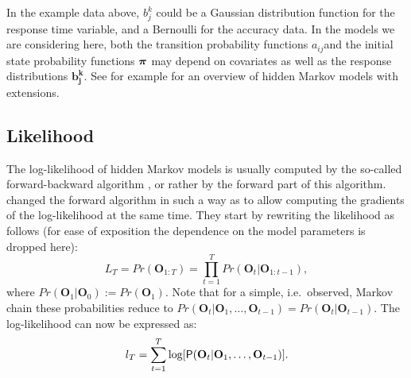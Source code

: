 \documentclass[article]{jss}
\newcommand{\vc}{\mathbf}
\newcommand{\greekv}[1]{\mbox{\boldmath$\mathrm{#1}$}}
\begin{document}

In the example data above, $b_j^k$ could be a Gaussian distribution
function for the response time variable, and a Bernoulli for the
accuracy data.  In the models we are considering here, both the
transition probability functions $a_{ij}$and the initial state
probability functions $\greekv{\pi}$ may depend on covariates as well
as the response distributions $\vc{b_{j}^{k}}$.  See for example
\citet{Fruhwirth2006} for an overview of hidden Markov models with
extensions.

\subsection{Likelihood}

The log-likelihood of hidden Markov models is usually computed by the
so-called forward-backward algorithm \citep{Baum1966,Rabiner1989}, or
rather by the forward part of this algorithm.  \cite{Lystig2002}
changed the forward algorithm in such a way as to allow computing the
gradients of the log-likelihood at the same time.  They start by
rewriting the likelihood as follows (for ease of exposition the
dependence on the model parameters is dropped here):
\begin{equation}
	L_{T} = Pr(\vc{O}_{1:T}) = \prod_{t=1}^{T} 
	Pr(\vc{O}_{t}|\vc{O}_{1:t-1}), 
	\label{condLike}
\end{equation}
where $Pr(\vc{O}_{1}|\vc{O}_{0}):=Pr(\vc{O}_{1})$. Note that for a 
simple, i.e.\ observed, Markov chain these probabilities reduce to 
$Pr(\vc{O}_{t}|\vc{O}_{1},\ldots, 
\vc{O}_{t-1})=Pr(\vc{O}_{t}|\vc{O}_{t-1})$.
The log-likelihood can now be expressed as:
\begin{equation}
	l_{T} = \sum_{t=1}^{T} \log[\Prob(\vc{O}_{t}|\vc{O}_{1}, \ldots, 
\vc{O}_{t-1})].
	\label{eq:condLogl}
\end{equation}
\end{document}
